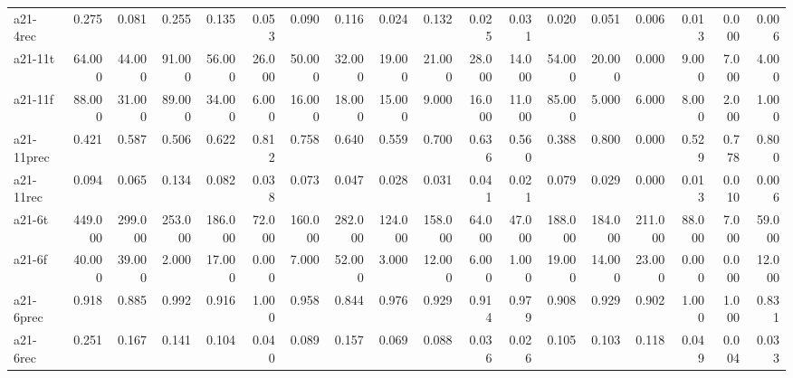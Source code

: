 \begin{tabular}{lrrrrrrrrrrrrrrrrr}
a21-4rec   &    0.275 &    0.081 &    0.255 &      0.135 &   0.053 &    0.090 &       0.116 &    0.024 &           0.132 &       0.025 &    0.031 &       0.020 &       0.051 &    0.006 &   0.013 &   0.000 &   0.006 \\
a21-11t    &   64.000 &   44.000 &   91.000 &     56.000 &  26.000 &   50.000 &      32.000 &   19.000 &          21.000 &      28.000 &   14.000 &      54.000 &      20.000 &    0.000 &   9.000 &   7.000 &   4.000 \\
a21-11f    &   88.000 &   31.000 &   89.000 &     34.000 &   6.000 &   16.000 &      18.000 &   15.000 &           9.000 &      16.000 &   11.000 &      85.000 &       5.000 &    6.000 &   8.000 &   2.000 &   1.000 \\
a21-11prec &    0.421 &    0.587 &    0.506 &      0.622 &   0.812 &    0.758 &       0.640 &    0.559 &           0.700 &       0.636 &    0.560 &       0.388 &       0.800 &    0.000 &   0.529 &   0.778 &   0.800 \\
a21-11rec  &    0.094 &    0.065 &    0.134 &      0.082 &   0.038 &    0.073 &       0.047 &    0.028 &           0.031 &       0.041 &    0.021 &       0.079 &       0.029 &    0.000 &   0.013 &   0.010 &   0.006 \\
a21-6t     &  449.000 &  299.000 &  253.000 &    186.000 &  72.000 &  160.000 &     282.000 &  124.000 &         158.000 &      64.000 &   47.000 &     188.000 &     184.000 &  211.000 &  88.000 &   7.000 &  59.000 \\
a21-6f     &   40.000 &   39.000 &    2.000 &     17.000 &   0.000 &    7.000 &      52.000 &    3.000 &          12.000 &       6.000 &    1.000 &      19.000 &      14.000 &   23.000 &   0.000 &   0.000 &  12.000 \\
a21-6prec  &    0.918 &    0.885 &    0.992 &      0.916 &   1.000 &    0.958 &       0.844 &    0.976 &           0.929 &       0.914 &    0.979 &       0.908 &       0.929 &    0.902 &   1.000 &   1.000 &   0.831 \\
a21-6rec   &    0.251 &    0.167 &    0.141 &      0.104 &   0.040 &    0.089 &       0.157 &    0.069 &           0.088 &       0.036 &    0.026 &       0.105 &       0.103 &    0.118 &   0.049 &   0.004 &   0.033 \\
\bottomrule
\end{tabular}
